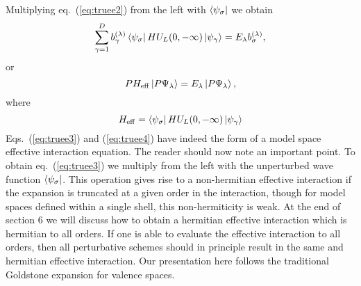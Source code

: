 Multiplying eq.\ (\ref{eq:truee2}) from the left with 
$\left\langle \psi_{\sigma} \right|$ we obtain
\begin{equation}
     {\displaystyle
     \sum_{\gamma =1}^{D}b_{\gamma}^{(\lambda )}\left\langle \psi_{\sigma} \right|
     HU_L(0,-\infty )\left| \psi_{\gamma} \right\rangle  } =
     E_{\lambda}b_{\sigma}^{(\lambda )},
     \label{eq:truee3}
\end{equation}
or
\begin{equation}
     PH_{\mathrm{eff}}\left| P\Psi_{\lambda} \right\rangle=
     E_{\lambda}\left| P\Psi_{\lambda} \right\rangle,
     \label{eq:truee4}
\end{equation}
where
\begin{equation}
     H_{\mathrm{eff}}=
     \left\langle \psi_{\sigma} \right|
     HU_L(0,-\infty )\left| \psi_{\gamma} \right\rangle  
\label{eq:heff1}
\end{equation}
Eqs.\ (\ref{eq:truee3}) and (\ref{eq:truee4}) have indeed the form of a
model space effective interaction equation. 
The reader should now note an important point. To obtain
eq.\ (\ref{eq:truee3}) we multiply from the left with the
unperturbed wave function $\left\langle \psi_{\sigma} \right|$. This operation gives rise
to a non-hermitian effective interaction if the expansion
is truncated at a given order in the interaction, though  for model spaces
defined within a single shell, this  non-hermiticity is weak. At the 
end of section 6 we will discuss how to obtain a hermitian effective
interaction which is hermitian to all orders. If one is able to evaluate
the effective interaction to all orders, then all perturbative schemes
should in principle result in the same and hermitian effective interaction.
Our presentation here follows the traditional Goldstone expansion for
valence spaces.

